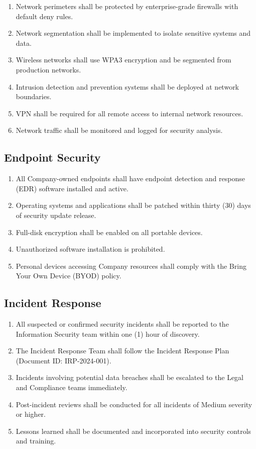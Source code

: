 \documentclass[
    language=english,
    doctype=policy-document,
    institution=none,
]{../../omnilatex}
\begin{document}
\begin{enumerate}[label=\textbf{\arabic*.}]
    \item Network perimeters shall be protected by enterprise-grade firewalls with default deny rules.
    \item Network segmentation shall be implemented to isolate sensitive systems and data.
    \item Wireless networks shall use WPA3 encryption and be segmented from production networks.
    \item Intrusion detection and prevention systems shall be deployed at network boundaries.
    \item VPN shall be required for all remote access to internal network resources.
    \item Network traffic shall be monitored and logged for security analysis.
\end{enumerate}

\subsection{Endpoint Security}

\begin{enumerate}[label=\textbf{\arabic*.}]
    \item All Company-owned endpoints shall have endpoint detection and response (EDR) software installed and active.
    \item Operating systems and applications shall be patched within thirty (30) days of security update release.
    \item Full-disk encryption shall be enabled on all portable devices.
    \item Unauthorized software installation is prohibited.
    \item Personal devices accessing Company resources shall comply with the Bring Your Own Device (BYOD) policy.
\end{enumerate}

\subsection{Incident Response}

\begin{enumerate}[label=\textbf{\arabic*.}]
    \item All suspected or confirmed security incidents shall be reported to the Information Security team within one (1) hour of discovery.
    \item The Incident Response Team shall follow the Incident Response Plan (Document ID: IRP-2024-001).
    \item Incidents involving potential data breaches shall be escalated to the Legal and Compliance teams immediately.
    \item Post-incident reviews shall be conducted for all incidents of Medium severity or higher.
    \item Lessons learned shall be documented and incorporated into security controls and training.
\end{enumerate}
\end{document}

